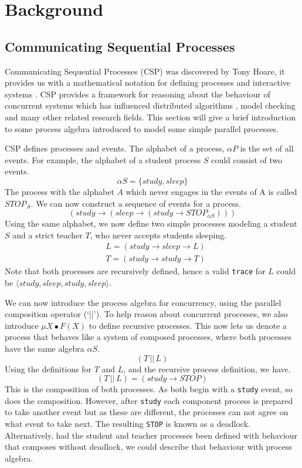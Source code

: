 \chapter{Background}
\section[]{Communicating Sequential Processes}
Communicating Sequential Processes (CSP) was discovered by Tony Hoare, it provides us with a mathematical notation for defining processes and interactive systems \cite{csp_paper}. CSP provides a framework for reasoning about the behaviour of concurrent systems which has influenced distributed algorithms \cite{distributed_algorithms_na_lynch}, model checking \cite{model_checking} and many other related research fields. This section will give a brief introduction to some process algebra introduced to model some simple parallel processes.
\par
CSP defines processes and events. The alphabet of a process, $\alpha P$ is the set of all events. For example, the alphabet of a student process $S$ could consist of two events.
\[
\alpha S = \{study, sleep\}
\]
The process with the alphabet $A$ which never engages in the events of A is called $STOP_A$. We can now construct a sequence of events for a process.
\[
(study \rightarrow (sleep \rightarrow (study \rightarrow STOP_{\alpha S})))
\]
Using the same alphabet, we now define two simple processes modeling a student $S$ and a strict teacher $T$, who never accepts students sleeping.
\[
\begin{aligned}
& L = (study \rightarrow sleep \rightarrow L) \\
& T = (study \rightarrow study \rightarrow T) 
\end{aligned}
\]
Note that both processes are recursively defined, hence a valid \texttt{trace} for $L$ could be $\langle study, sleep, study, sleep \rangle$.
\par
We can now introduce the process algebra for concurrency, using the parallel composition operator (`||'). To help reason about concurrent processes, we also introduce $\mu X \bullet F(X)$ to define recursive processes. This now lets us denote a process that behaves like a system of composed processes, where both processes have the same algebra $\alpha S$.
\[
(T \,||\, L)    
\]
Using the definitions for $T$ and $L$, and the recursive process definition, we have.
\[
(T \,||\, L) = (study \rightarrow STOP)    
\]
This is the composition of both processes. As both begin with a \texttt{study} event, so does the composition. However, after \texttt{study} each component process is prepared to take another event but as these are different, the processes can not agree on what event to take next. The resulting \texttt{STOP} is known as a deadlock. Alternatively, had the student and teacher processes been defined with behaviour that composes without deadlock, we could describe that behaviour with process algebra.
